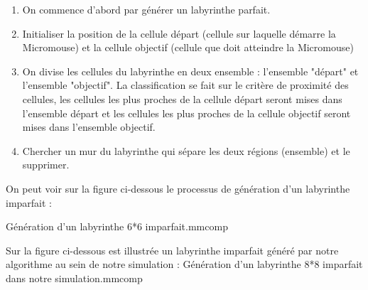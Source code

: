 \begin{enumerate}
    \item On commence d'abord par générer un labyrinthe parfait.
    \item Initialiser la position de la cellule départ (cellule sur laquelle démarre la Micromouse) et la cellule objectif (cellule que doit atteindre la Micromouse)
    \item On divise les cellules du labyrinthe en deux ensemble : l'ensemble "départ" et l'ensemble "objectif". La classification se fait sur le critère de proximité des cellules, les cellules les plus proches de la cellule départ seront mises dans l'ensemble départ et les cellules les plus proches de la cellule objectif seront mises dans l'ensemble objectif.
    \item Chercher un mur du labyrinthe qui sépare les deux régions (ensemble) et le supprimer.
    \\
    \newline
\end{enumerate}

On peut voir sur la figure ci-dessous le processus de génération d'un labyrinthe imparfait : 

{Génération d'un labyrinthe 6*6 imparfait.}{mmcomp}

Sur la figure ci-dessous est illustrée un labyrinthe imparfait généré par notre algorithme au sein de notre simulation : 
\newpage
{}
{Génération d'un labyrinthe 8*8 imparfait dans notre simulation.}{mmcomp}

